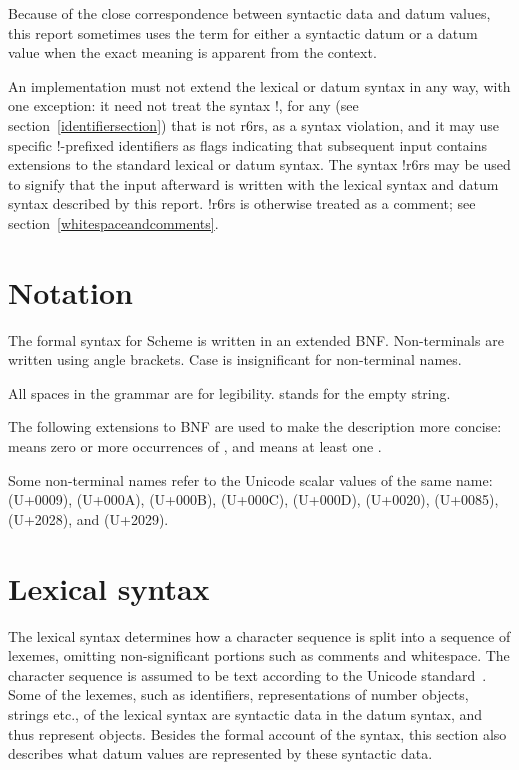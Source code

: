 Because of the close correspondence between syntactic data and datum
values, this report sometimes uses the term  for
either a syntactic datum or a datum value when the exact meaning
is apparent from the context.

An implementation must not extend the lexical or datum syntax in
any way, with one exception: it need not treat the syntax
{\cf \sharpsign{}!}, for any  (see
section~\ref{identifiersection}) that is not {\cf r6rs}, as a syntax
violation, and it may use specific {\cf \sharpsign{}!}-prefixed
identifiers as flags indicating that subsequent input contains extensions
to the standard lexical or datum syntax. 
The syntax {\cf \sharpsign{}!r6rs} may be used to signify that
the input afterward is written with the lexical syntax and
datum syntax described by
this report.
{\cf \sharpsign{}!r6rs} is otherwise treated as a comment; see section~\ref{whitespaceandcomments}.

\section{Notation}
\label{BNF}

The formal syntax for Scheme is written in an extended BNF.
Non-terminals are written using angle brackets.  Case is insignificant
for non-terminal names.

All spaces in the grammar are for legibility.
 stands for the empty string.

The following extensions to BNF are used to make the description more
concise:   means zero or more occurrences of
, and  means at least one
.

Some non-terminal names refer to the Unicode scalar values of the same
name:  (U+0009),  (U+000A),
 (U+000B),
 (U+000C),  (U+000D),
 (U+0020),  (U+0085),  (U+2028), and  (U+2029).

\section{Lexical syntax}
\label{lexicalsyntaxsection}

The lexical syntax determines how a character sequence is split into a
sequence of lexemes, omitting non-significant portions
such as comments and whitespace.  The character sequence is assumed to
be text according to the Unicode standard~\cite{Unicode}.  Some of
the lexemes, such as identifiers, representations of number objects, strings etc., of the lexical
syntax are syntactic data in the datum syntax, and thus represent objects.
Besides the formal account of the syntax, this section also describes
what datum values are represented by these syntactic data.

